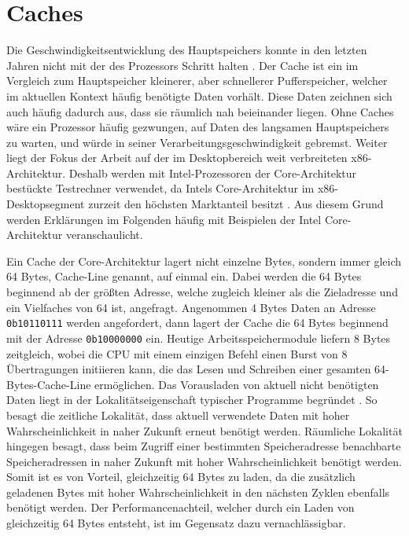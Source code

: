 
\section{Caches}

Die Geschwindigkeitsentwicklung des Hauptspeichers konnte in den letzten Jahren nicht mit der des Prozessors Schritt halten \cite{speedGapCPUandRAM}. Der Cache ist ein im Vergleich zum Hauptspeicher kleinerer, aber schnellerer Pufferspeicher, welcher im aktuellen Kontext häufig benötigte Daten vorhält. Diese Daten zeichnen sich auch häufig dadurch aus, dass sie räumlich nah beieinander liegen.
Ohne Caches wäre ein Prozessor häufig gezwungen, auf Daten des langsamen Hauptspeichers zu warten, und würde in seiner Verarbeitungsgeschwindigkeit gebremst. %
Weiter liegt der Fokus der Arbeit auf der im Desktopbereich weit verbreiteten x86-Architektur. Deshalb werden mit Intel-Prozessoren der Core-Architektur bestückte Testrechner verwendet, da Intels Core-Architektur im x86-Desktopsegment zurzeit den höchsten Marktanteil besitzt \cite{AMDIntelMarketShare}. Aus diesem Grund werden Erklärungen im Folgenden häufig mit Beispielen der Intel Core-Architektur veranschaulicht.

Ein Cache der Core-Architektur lagert nicht einzelne Bytes, sondern immer gleich 64 Bytes, Cache-Line genannt, auf einmal ein. Dabei werden die 64 Bytes beginnend ab der größten Adresse, welche zugleich kleiner als die Zieladresse und ein Vielfaches von 64 ist, angefragt.
Angenommen 4 Bytes Daten an Adresse \lstinline!0b10110111!
werden angefordert, dann lagert der Cache die 64 Bytes beginnend mit der Adresse \lstinline!0b10000000! ein.
Heutige Arbeitsspeichermodule liefern 8 Bytes zeitgleich, wobei die CPU mit einem einzigen Befehl einen Burst von 8 Übertragungen initiieren kann, die das Lesen und Schreiben einer gesamten 64-Bytes-Cache-Line ermöglichen.
Das Vorausladen von aktuell nicht benötigten Daten liegt in der Lokalitätseigenschaft typischer Programme begründet \cite{tanenbaumLocality}. So besagt die zeitliche Lokalität, dass aktuell verwendete Daten mit hoher Wahrscheinlichkeit in naher Zukunft erneut benötigt werden. Räumliche Lokalität hingegen besagt, dass beim Zugriff einer bestimmten Speicheradresse benachbarte Speicheradressen in naher Zukunft mit hoher Wahrscheinlichkeit benötigt werden.
Somit ist es von Vorteil, gleichzeitig 64 Bytes zu laden, da die zusätzlich geladenen Bytes mit hoher Wahrscheinlichkeit in den nächsten Zyklen ebenfalls benötigt werden. Der Performancenachteil, welcher durch ein Laden von gleichzeitig 64 Bytes entsteht, ist im Gegensatz dazu vernachlässigbar.

